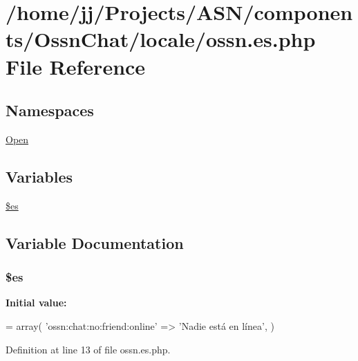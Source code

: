 \hypertarget{components_2_ossn_chat_2locale_2ossn_8es_8php}{}\section{/home/jj/\+Projects/\+A\+S\+N/components/\+Ossn\+Chat/locale/ossn.es.\+php File Reference}
\label{components_2_ossn_chat_2locale_2ossn_8es_8php}
\subsection*{Namespaces}
\begin{DoxyCompactItemize}
\item 
 \hyperlink{namespace_open}{Open}
\end{DoxyCompactItemize}
\subsection*{Variables}
\begin{DoxyCompactItemize}
\item 
\hyperlink{components_2_ossn_chat_2locale_2ossn_8es_8php_a388cbda27103d2baee3997798d1f2744}{\$es}
\end{DoxyCompactItemize}


\subsection{Variable Documentation}
\subsubsection[{\texorpdfstring{\$es}{$es}}]{\setlength{\rightskip}{0pt plus 5cm}\$es}\hypertarget{components_2_ossn_chat_2locale_2ossn_8es_8php_a388cbda27103d2baee3997798d1f2744}{}\label{components_2_ossn_chat_2locale_2ossn_8es_8php_a388cbda27103d2baee3997798d1f2744}
{\bfseries Initial value\+:}
\begin{DoxyCode}
= array(
    \textcolor{stringliteral}{'ossn:chat:no:friend:online'} => \textcolor{stringliteral}{'Nadie está en línea'},
)
\end{DoxyCode}


Definition at line 13 of file ossn.\+es.\+php.

